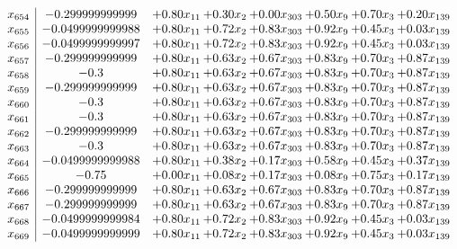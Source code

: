 \documentclass[8pt]{article}
\begin{document}
\[\begin{array}{c| c c@{\hskip 2pt} c@{\hskip 2pt} c@{\hskip 2pt} c@{\hskip 2pt} c@{\hskip 2pt} c@{\hskip 2pt} }
 x_{654}   &  -0.299999999999 & +  0.80 x_{11} & +  0.30 x_{2} & +  0.00 x_{303} & +  0.50 x_{9} & +  0.70 x_{3} & +  0.20 x_{139}\\
 x_{655}   &  -0.0499999999988 & +  0.80 x_{11} & +  0.72 x_{2} & +  0.83 x_{303} & +  0.92 x_{9} & +  0.45 x_{3} & +  0.03 x_{139}\\
 x_{656}   &  -0.0499999999997 & +  0.80 x_{11} & +  0.72 x_{2} & +  0.83 x_{303} & +  0.92 x_{9} & +  0.45 x_{3} & +  0.03 x_{139}\\
 x_{657}   &  -0.299999999999 & +  0.80 x_{11} & +  0.63 x_{2} & +  0.67 x_{303} & +  0.83 x_{9} & +  0.70 x_{3} & +  0.87 x_{139}\\
 x_{658}   &  -0.3 & +  0.80 x_{11} & +  0.63 x_{2} & +  0.67 x_{303} & +  0.83 x_{9} & +  0.70 x_{3} & +  0.87 x_{139}\\
 x_{659}   &  -0.299999999999 & +  0.80 x_{11} & +  0.63 x_{2} & +  0.67 x_{303} & +  0.83 x_{9} & +  0.70 x_{3} & +  0.87 x_{139}\\
 x_{660}   &  -0.3 & +  0.80 x_{11} & +  0.63 x_{2} & +  0.67 x_{303} & +  0.83 x_{9} & +  0.70 x_{3} & +  0.87 x_{139}\\
 x_{661}   &  -0.3 & +  0.80 x_{11} & +  0.63 x_{2} & +  0.67 x_{303} & +  0.83 x_{9} & +  0.70 x_{3} & +  0.87 x_{139}\\
 x_{662}   &  -0.299999999999 & +  0.80 x_{11} & +  0.63 x_{2} & +  0.67 x_{303} & +  0.83 x_{9} & +  0.70 x_{3} & +  0.87 x_{139}\\
 x_{663}   &  -0.3 & +  0.80 x_{11} & +  0.63 x_{2} & +  0.67 x_{303} & +  0.83 x_{9} & +  0.70 x_{3} & +  0.87 x_{139}\\
 x_{664}   &  -0.0499999999988 & +  0.80 x_{11} & +  0.38 x_{2} & +  0.17 x_{303} & +  0.58 x_{9} & +  0.45 x_{3} & +  0.37 x_{139}\\
 x_{665}   &  -0.75 & +  0.00 x_{11} & +  0.08 x_{2} & +  0.17 x_{303} & +  0.08 x_{9} & +  0.75 x_{3} & +  0.17 x_{139}\\
 x_{666}   &  -0.299999999999 & +  0.80 x_{11} & +  0.63 x_{2} & +  0.67 x_{303} & +  0.83 x_{9} & +  0.70 x_{3} & +  0.87 x_{139}\\
 x_{667}   &  -0.299999999999 & +  0.80 x_{11} & +  0.63 x_{2} & +  0.67 x_{303} & +  0.83 x_{9} & +  0.70 x_{3} & +  0.87 x_{139}\\
 x_{668}   &  -0.0499999999984 & +  0.80 x_{11} & +  0.72 x_{2} & +  0.83 x_{303} & +  0.92 x_{9} & +  0.45 x_{3} & +  0.03 x_{139}\\
 x_{669}   &  -0.0499999999999 & +  0.80 x_{11} & +  0.72 x_{2} & +  0.83 x_{303} & +  0.92 x_{9} & +  0.45 x_{3} & +  0.03 x_{139}\\

\end{array}\]
\end{document}
